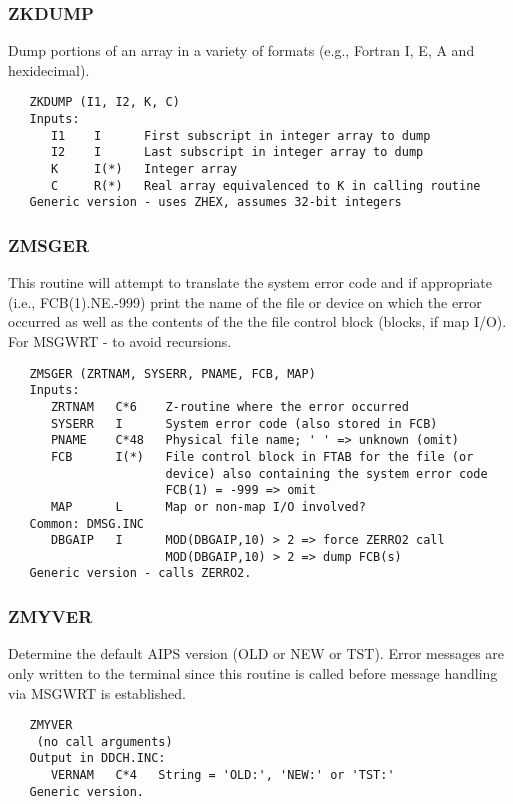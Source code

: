 \subsubsection{ZKDUMP}
Dump portions of an array in a variety of formats (e.g., Fortran
I, E, A and hexidecimal).
\begin{verbatim}
   ZKDUMP (I1, I2, K, C)
   Inputs:
      I1    I      First subscript in integer array to dump
      I2    I      Last subscript in integer array to dump
      K     I(*)   Integer array
      C     R(*)   Real array equivalenced to K in calling routine
   Generic version - uses ZHEX, assumes 32-bit integers
\end{verbatim}

\subsubsection{ZMSGER}
This routine will attempt to translate the system error code and if
appropriate (i.e., FCB(1).NE.-999) print the name of the file or
device on which the error occurred as well as the contents of the
the file control block (blocks, if map I/O).
For MSGWRT - to avoid recursions.
\begin{verbatim}
   ZMSGER (ZRTNAM, SYSERR, PNAME, FCB, MAP)
   Inputs:
      ZRTNAM   C*6    Z-routine where the error occurred
      SYSERR   I      System error code (also stored in FCB)
      PNAME    C*48   Physical file name; ' ' => unknown (omit)
      FCB      I(*)   File control block in FTAB for the file (or
                      device) also containing the system error code
                      FCB(1) = -999 => omit
      MAP      L      Map or non-map I/O involved?
   Common: DMSG.INC
      DBGAIP   I      MOD(DBGAIP,10) > 2 => force ZERRO2 call
                      MOD(DBGAIP,10) > 2 => dump FCB(s)
   Generic version - calls ZERRO2.
\end{verbatim}

\subsubsection{ZMYVER}
Determine the default AIPS version (OLD or NEW or TST).  Error
messages are only written to the terminal since this routine is
called before message handling via MSGWRT is established.
\begin{verbatim}
   ZMYVER
    (no call arguments)
   Output in DDCH.INC:
      VERNAM   C*4   String = 'OLD:', 'NEW:' or 'TST:'
   Generic version.
\end{verbatim}
